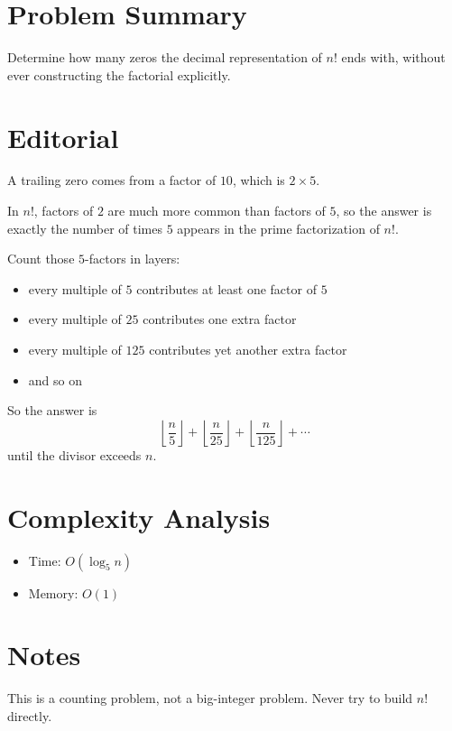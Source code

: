 \section{Problem Summary}
Determine how many zeros the decimal representation of \(n!\) ends with, without ever constructing the factorial explicitly.

\section{Editorial}
A trailing zero comes from a factor of \(10\), which is \(2 \times 5\).

In \(n!\), factors of \(2\) are much more common than factors of \(5\), so the answer is exactly the number of times \(5\) appears in the prime factorization of \(n!\).

Count those \(5\)-factors in layers:
\begin{itemize}
\item every multiple of \(5\) contributes at least one factor of \(5\)
\item every multiple of \(25\) contributes one extra factor
\item every multiple of \(125\) contributes yet another extra factor
\item and so on
\end{itemize}

So the answer is
\[
\left\lfloor \frac{n}{5} \right\rfloor +
\left\lfloor \frac{n}{25} \right\rfloor +
\left\lfloor \frac{n}{125} \right\rfloor + \cdots
\]
until the divisor exceeds \(n\).

\section{Complexity Analysis}
\begin{itemize}
\item Time: \(O(\log_5 n)\)
\item Memory: \(O(1)\)
\end{itemize}

\section{Notes}
This is a counting problem, not a big-integer problem. Never try to build \(n!\) directly.
